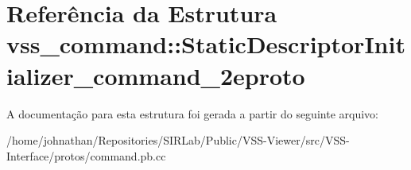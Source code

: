 \hypertarget{structvss__command_1_1StaticDescriptorInitializer__command__2eproto}{}\section{Referência da Estrutura vss\+\_\+command\+:\+:Static\+Descriptor\+Initializer\+\_\+command\+\_\+2eproto}
\label{structvss__command_1_1StaticDescriptorInitializer__command__2eproto}


A documentação para esta estrutura foi gerada a partir do seguinte arquivo\+:\begin{DoxyCompactItemize}
\item 
/home/johnathan/\+Repositories/\+S\+I\+R\+Lab/\+Public/\+V\+S\+S-\/\+Viewer/src/\+V\+S\+S-\/\+Interface/protos/command.\+pb.\+cc\end{DoxyCompactItemize}
